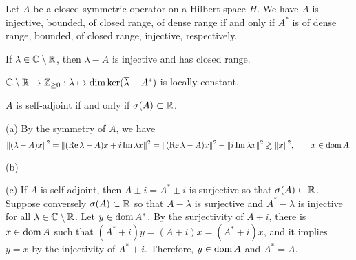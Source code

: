 \documentclass{../../large}
\begin{document}
\begin{prb}
Let $A$ be a closed symmetric operator on a Hilbert space $H$.
We have $A$ is injective, bounded, of closed range, of dense range if and only if $A^*$ is of dense range, bounded, of closed range, injective, respectively.
\begin{parts}
\item If $\lambda\in\mathbb{C}\setminus\mathbb{R}$, then $\lambda-A$ is injective and has closed range.
\item $\mathbb{C}\setminus\mathbb{R}\to\mathbb{Z}_{\ge0}:\lambda\mapsto\dim\ker(\overline\lambda-A^*)$ is locally constant.
\item $A$ is self-adjoint if and only if $\sigma(A)\subset\mathbb{R}$.
\end{parts}
\end{prb}
\begin{pf}
(a)
By the symmetry of $A$, we have
\[\|(\lambda-A)x\|^2=\|(\operatorname{Re}\lambda-A)x+i\operatorname{Im}\lambda x\|^2=\|(\operatorname{Re}\lambda-A)x\|^2+\|i\operatorname{Im}\lambda x\|^2\gtrsim\|x\|^2,\qquad x\in\operatorname{dom} A.\]

(b)

(c)
If $A$ is self-adjoint, then $A\pm i=A^*\pm i$ is surjective so that $\sigma(A)\subset\mathbb{R}$.
Suppose conversely $\sigma(A)\subset\mathbb{R}$ so that $A-\lambda$ is surjective and $A^*-\lambda$ is injective for all $\lambda\in\mathbb{C}\setminus\mathbb{R}$.
Let $y\in\operatorname{dom} A^*$.
By the surjectivity of $A+i$, there is $x\in\operatorname{dom} A$ such that $(A^*+i)y=(A+i)x=(A^*+i)x$, and it implies $y=x$ by the injectivity of $A^*+i$.
Therefore, $y\in\operatorname{dom} A$ and $A^*=A$.
\end{pf}
\end{document}
